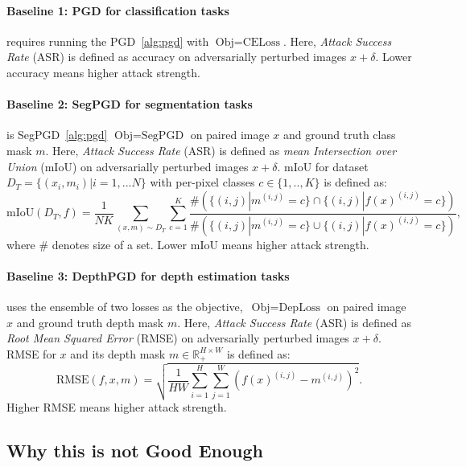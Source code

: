 \paragraph{Baseline 1: PGD for classification tasks} requires running the PGD~\cref{alg:pgd} with $\text{Obj}=\text{CELoss}$. Here, \textit{Attack Success Rate} (ASR) is defined as accuracy on adversarially perturbed images $x+\delta$. Lower accuracy means higher attack strength.

\paragraph{Baseline 2: SegPGD for segmentation tasks} is SegPGD~\cref{alg:pgd} $\text{Obj}=\text{SegPGD}$ on paired image $x$ and ground truth class mask $m$. Here, \textit{Attack Success Rate} (ASR) is defined as \textit{mean Intersection over Union} (mIoU) on adversarially perturbed images $x+\delta$. mIoU for dataset $D_T=\{(x_i,m_i)|i=1,...N\}$ with per-pixel classes $c\in\{1,..,K\}$ is defined as:
\begin{equation}
    \text{mIoU}(D_T,f)=\frac{1}{NK}\sum_{(x,m)\sim D_T}\sum_{c=1}^{K}\frac{\#(\{(i,j)|m^{(i,j)}=c\}\cap\{(i,j)|f(x)^{(i,j)}=c\})}{\#(\{(i,j)|m^{(i,j)}=c\}\cup\{(i,j)|f(x)^{(i,j)}=c\})}\text{,}
    \label{eq:miou}
\end{equation}
where $\#$ denotes size of a set. Lower mIoU means higher attack strength.

\paragraph{Baseline 3: DepthPGD for depth estimation tasks} uses the ensemble of two losses as the objective,~\ie $\text{Obj}=\text{DepLoss}$ on paired image $x$ and ground truth depth mask $m$. Here, \textit{Attack Success Rate} (ASR) is defined as \textit{Root Mean Squared Error} (RMSE) on adversarially perturbed images $x+\delta$. RMSE for $x$ and its depth mask $m\in\mathbb{R}_+^{H\times W}$ is defined as:
\begin{equation}
    \text{RMSE}(f,x,m)=\sqrt{
        \frac{1}{HW}\sum_{i=1}^{H}\sum_{j=1}^{W}(f(x)^{(i,j)}-m^{(i,j)})^2
    }\text{.}
    \label{eq:rmse}
\end{equation}
Higher RMSE means higher attack strength.

\subsection{Why this is not Good Enough}\label{sec:why_naive_advex_not_good_enough}

